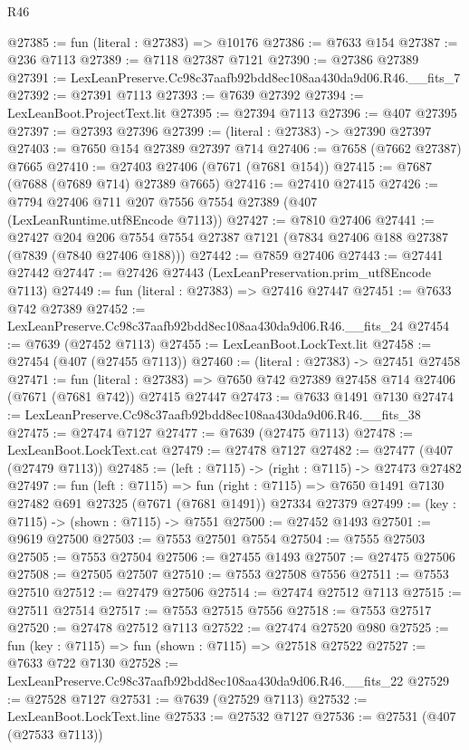 \begin{lexlean}{R46}
\begin{coremodule}
@27385 := fun (literal : @27383) => @10176
@27386 := @7633 @154
@27387 := @236 @7113
@27389 := @7118 @27387 @7121
@27390 := @27386 @27389
@27391 := LexLeanPreserve.Cc98c37aafb92bdd8ec108aa430da9d06.R46.__fits_7
@27392 := @27391 @7113
@27393 := @7639 @27392
@27394 := LexLeanBoot.ProjectText.lit
@27395 := @27394 @7113
@27396 := @407 @27395
@27397 := @27393 @27396
@27399 := (literal : @27383) -> @27390 @27397
@27403 := @7650 @154 @27389 @27397 @714
@27406 := @7658 (@7662 @27387) @7665
@27410 := @27403 @27406 (@7671 (@7681 @154))
@27415 := @7687 (@7688 (@7689 @714) @27389 @7665)
@27416 := @27410 @27415
@27426 := @7794 @27406 @711 @207 @7556 @7554 @27389 (@407 (LexLeanRuntime.utf8Encode @7113))
@27427 := @7810 @27406
@27441 := @27427
    @204
    @206
    @7554
    @7554
    @27387
    @7121
    (@7834 @27406 @188 @27387 (@7839 (@7840 @27406 @188)))
@27442 := @7859 @27406
@27443 := @27441 @27442
@27447 := @27426 @27443 (LexLeanPreservation.prim_utf8Encode @7113)
@27449 := fun (literal : @27383) => @27416 @27447
@27451 := @7633 @742 @27389
@27452 := LexLeanPreserve.Cc98c37aafb92bdd8ec108aa430da9d06.R46.__fits_24
@27454 := @7639 (@27452 @7113)
@27455 := LexLeanBoot.LockText.lit
@27458 := @27454 (@407 (@27455 @7113))
@27460 := (literal : @27383) -> @27451 @27458
@27471 := fun (literal : @27383) =>
  @7650 @742 @27389 @27458 @714 @27406 (@7671 (@7681 @742)) @27415 @27447
@27473 := @7633 @1491 @7130
@27474 := LexLeanPreserve.Cc98c37aafb92bdd8ec108aa430da9d06.R46.__fits_38
@27475 := @27474 @7127
@27477 := @7639 (@27475 @7113)
@27478 := LexLeanBoot.LockText.cat
@27479 := @27478 @7127
@27482 := @27477 (@407 (@27479 @7113))
@27485 := (left : @7115) -> (right : @7115) -> @27473 @27482
@27497 := fun (left : @7115) =>
  fun (right : @7115) => @7650 @1491 @7130 @27482 @691 @27325 (@7671 (@7681 @1491)) @27334 @27379
@27499 := (key : @7115) -> (shown : @7115) -> @7551
@27500 := @27452 @1493
@27501 := @9619 @27500
@27503 := @7553 @27501 @7554
@27504 := @7555 @27503
@27505 := @7553 @27504
@27506 := @27455 @1493
@27507 := @27475 @27506
@27508 := @27505 @27507
@27510 := @7553 @27508 @7556
@27511 := @7553 @27510
@27512 := @27479 @27506
@27514 := @27474 @27512 @7113
@27515 := @27511 @27514
@27517 := @7553 @27515 @7556
@27518 := @7553 @27517
@27520 := @27478 @27512 @7113
@27522 := @27474 @27520 @980
@27525 := fun (key : @7115) => fun (shown : @7115) => @27518 @27522
@27527 := @7633 @722 @7130
@27528 := LexLeanPreserve.Cc98c37aafb92bdd8ec108aa430da9d06.R46.__fits_22
@27529 := @27528 @7127
@27531 := @7639 (@27529 @7113)
@27532 := LexLeanBoot.LockText.line
@27533 := @27532 @7127
@27536 := @27531 (@407 (@27533 @7113))

\end{coremodule}
\end{lexlean}
